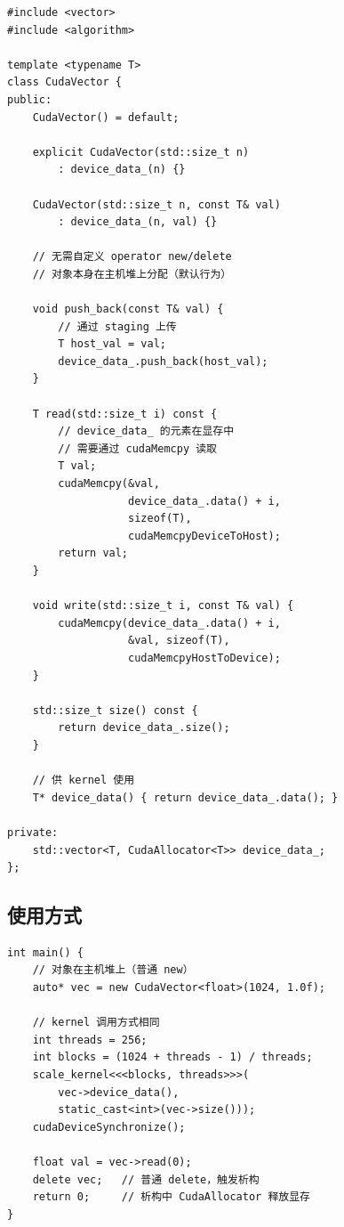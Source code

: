 \documentclass[12pt,a4paper,fontset=fandol]{ctexbook}
\begin{document}
\begin{lstlisting}
#include <vector>
#include <algorithm>

template <typename T>
class CudaVector {
public:
    CudaVector() = default;

    explicit CudaVector(std::size_t n)
        : device_data_(n) {}

    CudaVector(std::size_t n, const T& val)
        : device_data_(n, val) {}

    // 无需自定义 operator new/delete
    // 对象本身在主机堆上分配（默认行为）

    void push_back(const T& val) {
        // 通过 staging 上传
        T host_val = val;
        device_data_.push_back(host_val);
    }

    T read(std::size_t i) const {
        // device_data_ 的元素在显存中
        // 需要通过 cudaMemcpy 读取
        T val;
        cudaMemcpy(&val,
                   device_data_.data() + i,
                   sizeof(T),
                   cudaMemcpyDeviceToHost);
        return val;
    }

    void write(std::size_t i, const T& val) {
        cudaMemcpy(device_data_.data() + i,
                   &val, sizeof(T),
                   cudaMemcpyHostToDevice);
    }

    std::size_t size() const {
        return device_data_.size();
    }

    // 供 kernel 使用
    T* device_data() { return device_data_.data(); }

private:
    std::vector<T, CudaAllocator<T>> device_data_;
};
\end{lstlisting}

\subsection{使用方式}

\begin{lstlisting}
int main() {
    // 对象在主机堆上（普通 new）
    auto* vec = new CudaVector<float>(1024, 1.0f);

    // kernel 调用方式相同
    int threads = 256;
    int blocks = (1024 + threads - 1) / threads;
    scale_kernel<<<blocks, threads>>>(
        vec->device_data(),
        static_cast<int>(vec->size()));
    cudaDeviceSynchronize();

    float val = vec->read(0);
    delete vec;   // 普通 delete，触发析构
    return 0;     // 析构中 CudaAllocator 释放显存
}
\end{lstlisting}
\end{document}
